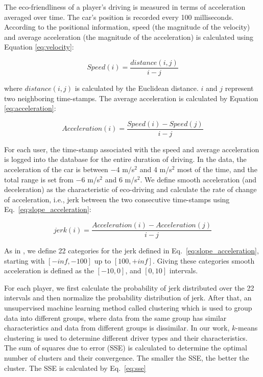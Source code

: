 \documentclass[preprint,authoryear,12pt]{elsarticle}
\begin{document}
The eco-friendliness of a player's driving is measured in terms of acceleration averaged over time.  The car's position is recorded every 100 milliseconds. According to the positional information, speed (the magnitude of the velocity) and average acceleration (the magnitude of the acceleration) is calculated using Equation \ref{eq:velocity}:

\begin{equation}\label{eq:velocity}
Speed(i) = \frac{distance(i,j)}{i-j}
\end{equation}

where $distance(i,j)$ is calculated by the Euclidean distance. $i$ and $j$ represent two neighboring time-stamps. The average acceleration is calculated by Equation \ref{eq:acceleration}:

\begin{equation}\label{eq:acceleration}
Acceleration(i) = \frac{Speed(i) - Speed(j)}{i-j}
\end{equation}

For each user, the time-stamp associated with the speed and average acceleration is logged into the database for the entire duration of driving. In the data, the acceleration of the car is between $-$4 m/s$^2$ and 4 m/s$^2$ most of the time, and the total range is set from $-$6 m/s$^2$ and 6 m/s$^2$.  We define smooth acceleration (and deceleration) as the characteristic of eco-driving and calculate the rate of change of acceleration, i.e., jerk between the two consecutive time-stamps using Eq.~\ref{eq:slope_acceleration}:

\begin{equation}\label{eq:slope_acceleration}
jerk(i) = \frac{Acceleration(i) - Acceleration(j)}{i-j}
\end{equation}

As in \cite{prendingeroliveira2014}, we define 22 categories for the jerk defined in Eq.~\ref{eq:slope_acceleration},
starting with $[-inf , -100]$ up to $[100, +inf]$. Giving these categories smooth acceleration is defined as the $[-10, 0]$, and $[0, 10]$ intervals.

For each player, we first calculate the probability of jerk distributed over the 22 intervals and then normalize the probability distribution of jerk.
After that, an unsupervised machine learning method called clustering which is used to group data into different groups, where data from the same group has similar characteristics and data from different groups is dissimilar.
In our work, $k$-means clustering is used \citep{KMEAN.1979} to determine different driver types and their characteristics. The sum of squares due to error (SSE) is calculated to determine the optimal number of clusters and their convergence.  The smaller the SSE, the better the cluster. The SSE is calculated by Eq.~\ref{eq:sse}
\end{document}
